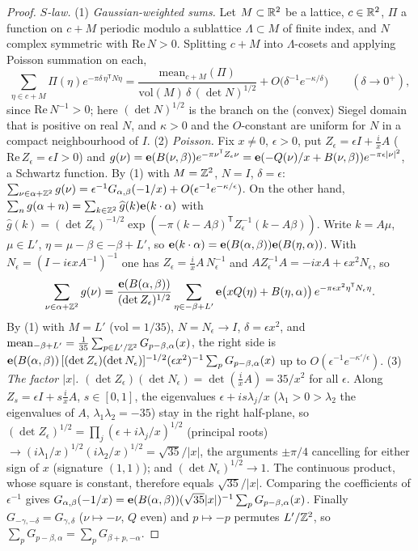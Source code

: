 \begin{proof}
\emph{$S$-law.} (1) \emph{Gaussian-weighted sums.} Let $M\subset\mathbb{R}^2$ be a lattice, $c\in\mathbb{R}^2$, $\Pi$ a function on $c+M$ periodic modulo a
sublattice $\Lambda\subset M$ of finite index, and $N$ complex symmetric with $\mathrm{Re}\,N>0$. Splitting $c+M$ into $\Lambda$-cosets and applying
Poisson summation on each,
\[
\sum_{\eta\in c+M}\Pi(\eta)e^{-\pi\delta\,\eta^{\mathsf T}N\eta}=\frac{\mathrm{mean}_{c+M}(\Pi)}{\mathrm{vol}(M)\,\delta\,(\det N)^{1/2}}+O\bigl(\delta^{-1}e^{-\kappa/\delta}\bigr)
\qquad(\delta\to0^+),
\]
since $\mathrm{Re}\,N^{-1}>0$; here $(\det N)^{1/2}$ is the branch on the (convex) Siegel domain that is positive on real $N$, and $\kappa>0$ and the
$O$-constant are uniform for $N$ in a compact neighbourhood of $I$.
(2) \emph{Poisson.} Fix $x\ne0$, $\epsilon>0$, put $Z_\epsilon=\epsilon I+\tfrac ixA$ ($\mathrm{Re}\,Z_\epsilon=\epsilon I>0$) and
$g(\nu)=\mathbf{e}(B(\nu,\beta))e^{-\pi\nu^{\mathsf T}Z_\epsilon\nu}=\mathbf{e}(-Q(\nu)/x+B(\nu,\beta))e^{-\pi\epsilon|\nu|^2}$, a Schwartz function. By (1) with
$M=\mathbb{Z}^2$, $N=I$, $\delta=\epsilon$: $\sum_{\nu\in\alpha+\mathbb{Z}^2}g(\nu)=\epsilon^{-1}G_{\alpha,\beta}(-1/x)+O(\epsilon^{-1}e^{-\kappa/\epsilon})$.
On the other hand, $\sum_ng(\alpha+n)=\sum_{k\in\mathbb{Z}^2}\widehat g(k)\mathbf{e}(k\cdot\alpha)$ with
$\widehat g(k)=(\det Z_\epsilon)^{-1/2}\exp(-\pi(k-A\beta)^{\mathsf T}Z_\epsilon^{-1}(k-A\beta))$. Write $k=A\mu$, $\mu\in L'$, $\eta=\mu-\beta\in-\beta+L'$,
so $\mathbf{e}(k\cdot\alpha)=\mathbf{e}(B(\alpha,\beta))\mathbf{e}(B(\eta,\alpha))$. With $N_\epsilon=(I-i\epsilon xA^{-1})^{-1}$ one has
$Z_\epsilon=\tfrac ixA\,N_\epsilon^{-1}$ and $AZ_\epsilon^{-1}A=-ixA+\epsilon x^2N_\epsilon$, so
\[
\sum_{\nu\in\alpha+\mathbb{Z}^2}g(\nu)=\frac{\mathbf{e}(B(\alpha,\beta))}{(\det Z_\epsilon)^{1/2}}\sum_{\eta\in-\beta+L'}\mathbf{e}\bigl(xQ(\eta)+B(\eta,\alpha)\bigr)\,
e^{-\pi\epsilon x^2\eta^{\mathsf T}N_\epsilon\eta}.
\]
By (1) with $M=L'$ ($\mathrm{vol}=1/35$), $N=N_\epsilon\to I$, $\delta=\epsilon x^2$, and
$\mathrm{mean}_{-\beta+L'}=\tfrac1{35}\sum_{p\in L'/\mathbb{Z}^2}G_{p-\beta,\alpha}(x)$, the right side is
$\mathbf{e}(B(\alpha,\beta))\,[(\det Z_\epsilon)(\det N_\epsilon)]^{-1/2}(\epsilon x^2)^{-1}\sum_pG_{p-\beta,\alpha}(x)$ up to $O(\epsilon^{-1}e^{-\kappa'/\epsilon})$.
(3) \emph{The factor $|x|$.} $(\det Z_\epsilon)(\det N_\epsilon)=\det(\tfrac ixA)=35/x^2$ for all $\epsilon$. Along $Z_{s}=\epsilon I+s\tfrac ixA$, $s\in[0,1]$,
the eigenvalues $\epsilon+is\lambda_j/x$ ($\lambda_1>0>\lambda_2$ the eigenvalues of $A$, $\lambda_1\lambda_2=-35$) stay in the right half-plane, so
$(\det Z_\epsilon)^{1/2}=\prod_j(\epsilon+i\lambda_j/x)^{1/2}$ (principal roots) $\to(i\lambda_1/x)^{1/2}(i\lambda_2/x)^{1/2}=\sqrt{35}/|x|$, the arguments
$\pm\pi/4$ cancelling for either sign of $x$ (signature $(1,1)$); and $(\det N_\epsilon)^{1/2}\to1$. The continuous product, whose square is
constant, therefore equals $\sqrt{35}/|x|$. Comparing the coefficients of $\epsilon^{-1}$ gives
$G_{\alpha,\beta}(-1/x)=\mathbf{e}(B(\alpha,\beta))(\sqrt{35}|x|)^{-1}\sum_pG_{p-\beta,\alpha}(x)$. Finally $G_{-\gamma,-\delta}=G_{\gamma,\delta}$ ($\nu\mapsto-\nu$,
$Q$ even) and $p\mapsto-p$ permutes $L'/\mathbb{Z}^2$, so $\sum_pG_{p-\beta,\alpha}=\sum_pG_{\beta+p,-\alpha}$.
\end{proof}
